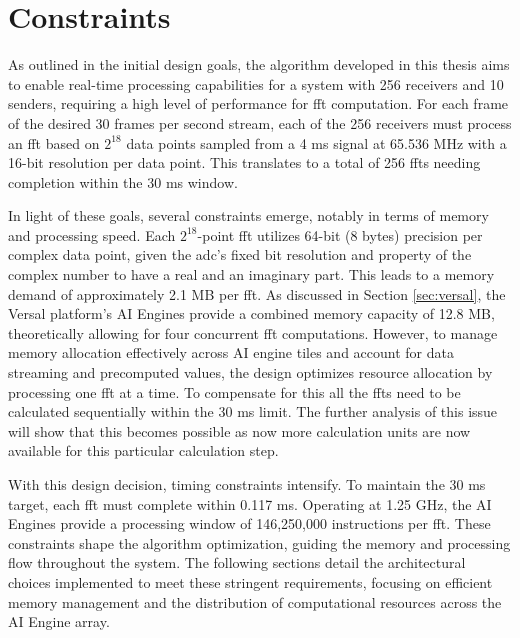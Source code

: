 \section{Constraints}
As outlined in the initial design goals, the algorithm developed in this thesis aims to enable real-time processing capabilities for a system with 256 receivers and 10 senders, requiring a high level of performance for \ac{fft} computation. For each frame of the desired 30 frames per second stream, each of the 256 receivers must process an \ac{fft} based on  $2^{18}$ data points sampled from a 4 ms signal at 65.536 MHz with a 16-bit resolution per data point. This translates to a total of 256 \ac{fft}s needing completion within the 30 ms window.\par
In light of these goals, several constraints emerge, notably in terms of memory and processing speed. Each $2^{18}$-point \ac{fft} utilizes 64-bit (8 bytes) precision per complex data point, given the \ac{adc}'s fixed bit resolution and property of the complex number to have a real and an imaginary part. This leads to a memory demand of approximately 2.1 MB per \ac{fft}. As discussed in Section \ref{sec:versal}, the Versal platform's AI Engines provide a combined memory capacity of 12.8 MB, theoretically allowing for four concurrent \ac{fft} computations. However, to manage memory allocation effectively across AI engine tiles and account for data streaming and precomputed values, the design optimizes resource allocation by processing one \ac{fft} at a time. To compensate for this all the \ac{fft}s need to be calculated sequentially within the 30 ms limit. The further analysis of this issue will show that this becomes possible as now more calculation units are now available for this particular calculation step.\par
With this design decision, timing constraints intensify. To maintain the 30 ms target, each \ac{fft} must complete within 0.117 ms. Operating at 1.25 GHz, the AI Engines provide a processing window of 146,250,000 instructions per \ac{fft}. These constraints shape the algorithm optimization, guiding the memory and processing flow throughout the system. The following sections detail the architectural choices implemented to meet these stringent requirements, focusing on efficient memory management and the distribution of computational resources across the AI Engine array.

